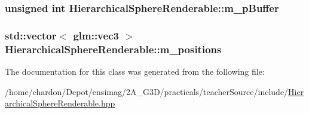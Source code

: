 \hypertarget{classHierarchicalSphereRenderable_a10b5df7bebe5790780d7f12dac654f5f}{
\subsubsection[{m\+\_\+p\+Buffer}]{\setlength{\rightskip}{0pt plus 5cm}unsigned int Hierarchical\+Sphere\+Renderable\+::m\+\_\+p\+Buffer\hspace{0.3cm}{\ttfamily [private]}}}\label{classHierarchicalSphereRenderable_a10b5df7bebe5790780d7f12dac654f5f}
\hypertarget{classHierarchicalSphereRenderable_a78da197355ab6d1e30978f0a9b24f8d1}{
\subsubsection[{m\+\_\+positions}]{\setlength{\rightskip}{0pt plus 5cm}std\+::vector$<$ glm\+::vec3 $>$ Hierarchical\+Sphere\+Renderable\+::m\+\_\+positions\hspace{0.3cm}{\ttfamily [private]}}}\label{classHierarchicalSphereRenderable_a78da197355ab6d1e30978f0a9b24f8d1}


The documentation for this class was generated from the following file\+:\begin{DoxyCompactItemize}
\item 
/home/chardon/\+Depot/ensimag/2\+A\+\_\+\+G3\+D/practicals/teacher\+Source/include/\hyperlink{HierarchicalSphereRenderable_8hpp}{Hierarchical\+Sphere\+Renderable.\+hpp}\end{DoxyCompactItemize}
